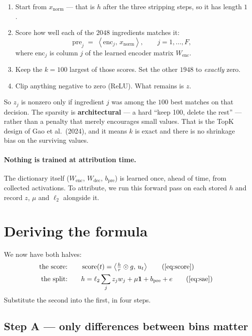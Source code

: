 \documentclass[11pt]{article}
\newcommand{\dotp}[2]{\left\langle #1,\, #2 \right\rangle}
\newcommand{\bpre}{b_{\mathrm{pre}}}
\newcommand{\xnorm}{x_{\mathrm{norm}}}
\begin{document}
\begin{enumerate}
\item Start from $\xnorm$ --- that is $h$ after the three stripping steps, so it has length $1$.
\item Score how well each of the $2048$ ingredients matches it:
      \[
      \mathrm{pre}_j \;=\; \dotp{\mathrm{enc}_j}{\xnorm}, \qquad j = 1, \dots, F,
      \]
      where $\mathrm{enc}_j$ is column $j$ of the learned encoder matrix $W_{\mathrm{enc}}$.
\item Keep the $k = 100$ largest of those scores. Set the other $1948$ to \emph{exactly} zero.
\item Clip anything negative to zero (ReLU). What remains is $z$.
\end{enumerate}

So $z_j$ is nonzero only if ingredient $j$ was among the $100$ best matches on that decision.
The sparsity is \textbf{architectural} --- a hard ``keep 100, delete the rest'' --- rather than
a penalty that merely encourages small values. That is the TopK design of Gao et al.\ (2024),
and it means $k$ is exact and there is no shrinkage bias on the surviving values.

\paragraph{Nothing is trained at attribution time.} The dictionary itself ($W_{\mathrm{enc}}$,
$W_{\mathrm{dec}}$, $\bpre$) is learned once, ahead of time, from collected activations. To
attribute, we run this forward pass on each stored $h$ and record $z$, $\mu$ and $\ell_2$
alongside it.

\section{Deriving the formula}
\label{sec:derivation}

We now have both halves:
\begin{align}
\text{the score:} \qquad & \operatorname{score}(t) = \dotp{\tfrac{h}{r} \odot g}{u_t}
  \tag{\ref{eq:score}} \\
\text{the split:} \qquad & h = \ell_2 \sum_j z_j w_j + \mu\mathbf{1} + \bpre + e
  \tag{\ref{eq:sae}}
\end{align}
Substitute the second into the first, in four steps.

\subsection*{Step A --- only differences between bins matter}
\end{document}
